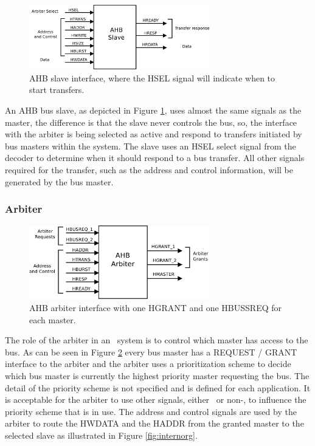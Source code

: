 \begin{figure}[!ht]
    \centering
    \includegraphics[width=0.7\textwidth]{figures/pdf/ahb_slave_new.pdf}
    \caption{AHB slave interface, where the HSEL signal will indicate when to start transfers.}
    \label{fig:slaveint}
\end{figure}
An AHB bus slave, as depicted in Figure \ref{fig:slaveint}, uses almost the same signals as the master, the difference is that the slave never controls the bus, so,  the interface with the arbiter is being selected as active and respond to transfers initiated by bus masters within the system. The slave uses an HSEL select signal from the decoder to determine when it should respond to a bus transfer. All other signals required for the transfer, such as the address and control information, will be generated by the bus master.
 
\subsubsection{Arbiter}
\begin{figure}[ht]
    \centering
    \includegraphics[width=0.7\textwidth]{figures/pdf/ahb_arbiter_new.pdf}
    \caption{AHB arbiter interface with one HGRANT and one HBUSSREQ for each master.}
    \label{fig:arbiterint}
\end{figure}

 The role of the arbiter in an \amba~system is to control which master has access to the bus. As can be seen in Figure \ref{fig:arbiterint} every bus master has a REQUEST / GRANT interface to the arbiter and the arbiter uses a prioritization scheme to decide which bus master is currently the highest priority master requesting the bus. The detail of the priority scheme is not specified and is defined for each application. It is acceptable for the arbiter to use other signals, either \amba~or non-\amba, to influence the priority scheme that is in use.
 The address and control signals are used by the arbiter to route the HWDATA and the HADDR from the granted master to the selected slave as illustrated in Figure     \ref{fig:internorg}.
 
